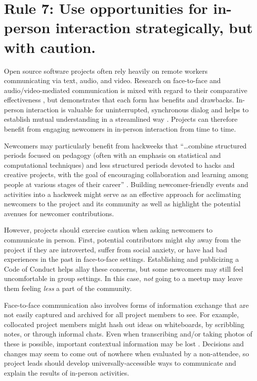 \documentclass[10pt,letterpaper]{article}
\newcommand{\rulemajor}[1]{\section*{#1}}
\begin{document}
\rulemajor{Rule 7: Use opportunities for in-person interaction strategically, but with caution.}

Open source software projects often rely heavily on remote workers communicating via text, audio, and video.
Research on face-to-face and audio/video-mediated communication is mixed
with regard to their comparative effectiveness \cite{doherty1997,gallupe1990,nardi2002},
but demonstrates that each form has benefits and drawbacks.
In-person interaction is valuable for uninterrupted, synchronous dialog
and helps to establish mutual understanding in a streamlined way \cite{omalley1996}.
Projects can therefore benefit from engaging newcomers in in-person interaction from time to time.

Newcomers may particularly benefit from hackweeks that ``{\ldots}combine structured periods focused on pedagogy
(often with an emphasis on statistical and computational techniques)
and less structured periods devoted to hacks and creative projects,
with the goal of encouraging collaboration and learning among people at various stages of their career'' \cite{huppenkothen2018}.
Building newcomer-friendly events and activities into a hackweek
might serve as an effective approach for acclimating newcomers to the project and its community
as well as highlight the potential avenues for newcomer contributions.

However,
projects should exercise caution when asking newcomers to communicate in person.
First, potential contributors might shy away from the project if they are introverted,
suffer from social anxiety,
or have had bad experiences in the past in face-to-face settings.
Establishing and publicizing a Code of Conduct helps allay these concerns,
but some newcomers may still feel uncomfortable in group settings.
In this case,
\emph{not} going to a meetup may leave them feeling \emph{less} a part of the community.

Face-to-face communication also involves forms of information exchange
that are not easily captured and archived for all project members to see.
For example,
collocated project members might hash out ideas on whiteboards,
by scribbling notes,
or through informal chats.
Even when transcribing and/or taking photos of these is possible,
important contextual information may be lost \cite{cherubini2007}.
Decisions and changes may seem to come out of nowhere when evaluated by a non-attendee,
so project leads should develop universally-accessible ways to communicate and explain the results of in-person activities.
\end{document}
